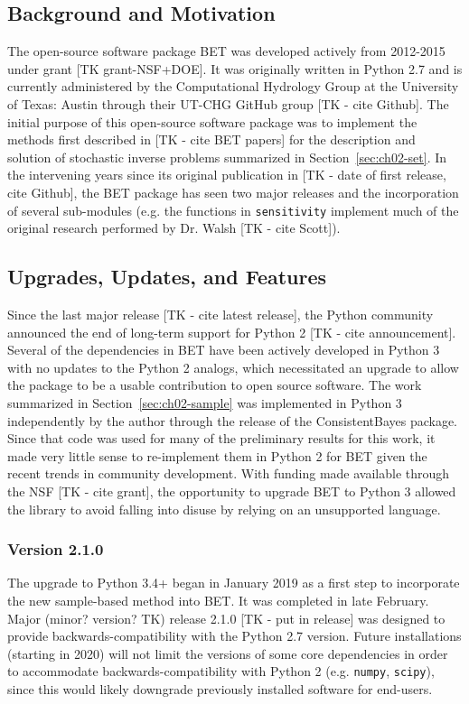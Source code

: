 \subsection{Background and Motivation}
The open-source software package BET was developed actively from 2012-2015 under grant [TK grant-NSF+DOE].
It was originally written in Python 2.7 and is currently administered by the Computational Hydrology Group at the University of Texas: Austin through their UT-CHG GitHub group [TK - cite Github].
The initial purpose of this open-source software package was to implement the methods first described in [TK - cite BET papers] for the description and solution of stochastic inverse problems summarized in Section~\ref{sec:ch02-set}.
In the intervening years since its original publication in [TK - date of first release, cite Github], the BET package has seen two major releases and the incorporation of several sub-modules (e.g. the functions in {\tt sensitivity} implement much of the original research performed by Dr. Walsh [TK - cite Scott]).


\subsection{Upgrades, Updates, and Features}
Since the last major release [TK - cite latest release], the Python community announced the end of long-term support for Python 2 [TK - cite announcement].
Several of the dependencies in BET have been actively developed in Python 3 with no updates to the Python 2 analogs, which necessitated an upgrade to allow the package to be a usable contribution to open source software.
The work summarized in Section~\ref{sec:ch02-sample} was implemented in Python 3 independently by the author through the release of the ConsistentBayes package.
Since that code was used for many of the preliminary results for this work, it made very little sense to re-implement them in Python 2 for BET given the recent trends in community development.
With funding made available through the NSF [TK - cite grant], the opportunity to upgrade BET to Python 3 allowed the library to avoid falling into disuse by relying on an unsupported language.


\subsubsection{Version 2.1.0}
The upgrade to Python 3.4+ began in January 2019 as a first step to incorporate the new sample-based method into BET.
It was completed in late February.
Major (minor? version? TK) release 2.1.0 [TK - put in release] was designed to provide backwards-compatibility with the Python 2.7 version.
Future installations (starting in 2020) will not limit the versions of some core dependencies in order to accommodate backwards-compatibility with Python 2 (e.g. {\tt numpy}, {\tt scipy}), since this would likely downgrade previously installed software for end-users.


